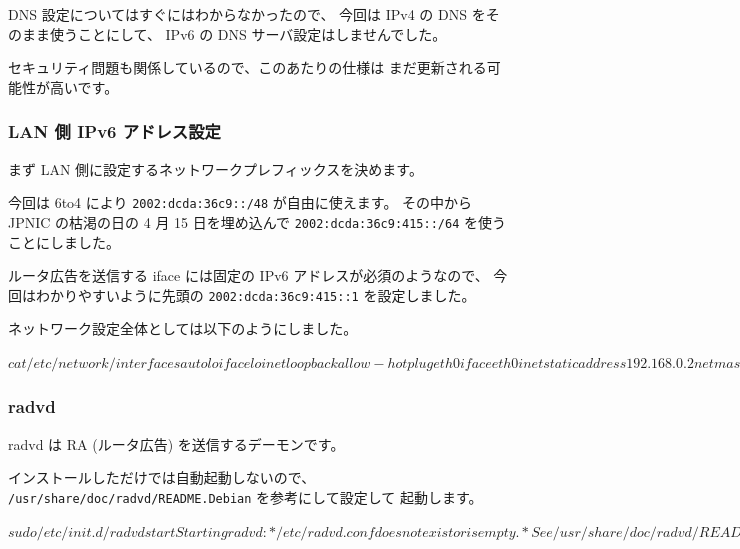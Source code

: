 \documentclass[mingoth,a4paper]{jsarticle}
\begin{document}
DNS 設定についてはすぐにはわからなかったので、
今回は IPv4 の DNS をそのまま使うことにして、
IPv6 の DNS サーバ設定はしませんでした。

セキュリティ問題も関係しているので、このあたりの仕様は
まだ更新される可能性が高いです。
\subsubsection{LAN 側 IPv6 アドレス設定}

まず LAN 側に設定するネットワークプレフィックスを決めます。

今回は 6to4 により \texttt{2002:dcda:36c9::/48} が自由に使えます。
その中から JPNIC の枯渇の日の 4 月 15 日を埋め込んで
\texttt{2002:dcda:36c9:415::/64} を使うことにしました。

ルータ広告を送信する iface には固定の IPv6 アドレスが必須のようなので、
今回はわかりやすいように先頭の \texttt{2002:dcda:36c9:415::1} を設定しました。

ネットワーク設定全体としては以下のようにしました。

\begin{commandline}
$ cat /etc/network/interfaces
auto lo
iface lo inet loopback

allow-hotplug eth0
iface eth0 inet static
address 192.168.0.2
netmask 255.255.255.0
iface eth0 inet6 static
address 2002:dcda:36c9:415::1
netmask 64

allow-hotplug eth1
iface eth1 inet static
address 220.218.54.201
netmask 255.255.255.240
gateway 220.218.54.193

auto tun6to4
iface tun6to4 inet6 v4tunnel
address 2002:dcda:36c9::1
netmask 16
gateway ::192.88.99.1
local 220.218.54.201
endpoint any
ttl 64
$
\end{commandline}
\subsubsection{radvd}

radvd は RA (ルータ広告) を送信するデーモンです。

インストールしただけでは自動起動しないので、
\texttt{/usr/share/doc/radvd/README.Debian} を参考にして設定して
起動します。

\begin{commandline}
$ sudo /etc/init.d/radvd start
Starting radvd:
* /etc/radvd.conf does not exist or is empty.
* See /usr/share/doc/radvd/README.Debian
* radvd will *not* be started.
$
\end{commandline}
\end{document}
